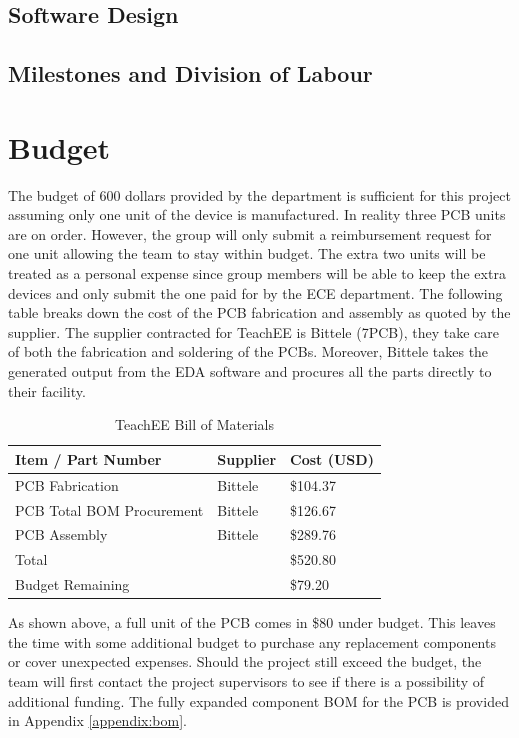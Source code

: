 \documentclass[letterpaper,12pt]{article}
\begin{document}
\subsection{Software Design}
\subsection{Milestones and Division of Labour}
\section{Budget} %
The budget of 600 dollars provided by the department is sufficient for this
project assuming only one unit of the device is manufactured. In reality three
PCB units are on order. However, the group will only submit a reimbursement
request for one unit allowing the team to stay within budget. The extra two
units will be treated as a personal expense since group members will be able to
keep the extra devices and only submit the one paid for by the ECE department.
The following table breaks down the cost of the PCB fabrication and assembly as
quoted by the supplier. The supplier contracted for TeachEE is Bittele (7PCB),
they take care of both the fabrication and soldering of the PCBs. Moreover,
Bittele takes the generated output from the EDA software and procures all the
parts directly to their facility.

\begin{table}[h!]
    \caption{TeachEE Bill of Materials}
    \begin{tabularx}{\textwidth}{l|l|l}
        \textbf{Item / Part Number} & \textbf{Supplier} & \textbf{Cost (USD)} \\
        \hline
        PCB Fabrication & Bittele & \$104.37\\
        PCB Total BOM Procurement & Bittele & \$126.67\\
        PCB Assembly & Bittele & \$289.76\\
        \hline
        Total & & \$520.80\\
        \hline
        Budget Remaining & & \$79.20
    \end{tabularx} 
\label{tab:abbreviated-bom}
\end{table}

\noindent
As shown above, a full unit of the PCB comes in \$80 under budget. This leaves
the time with some additional budget to purchase any replacement components or
cover unexpected expenses. Should the project still exceed the budget, the team
will first contact the project supervisors to see if there is a possibility of
additional funding. The fully expanded component BOM for the PCB is provided in
Appendix \ref{appendix:bom}.
\end{document}

